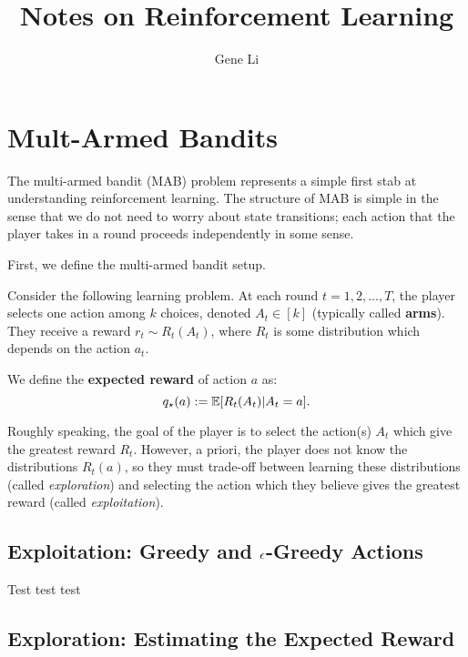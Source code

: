 \documentclass{article}
\title{Notes on Reinforcement Learning}
\author{Gene Li}
\begin{document}
\maketitle


\section{Mult-Armed Bandits}
The multi-armed bandit (MAB) problem represents a simple first stab at understanding reinforcement learning. The structure of MAB is simple in the sense that we do not need to worry about state transitions; each action that the player takes in a round proceeds independently in some sense.

First, we define the multi-armed bandit setup.

\begin{definition}
    Consider the following learning problem. At each round $t=1,2,...,T$, the player selects one action among $k$ choices, denoted $A_t \in [k]$ (typically called \textbf{arms}). They receive a reward $r_t \sim R_t(A_t)$, where $R_t$ is some distribution which depends on the action $a_t$. 
    
    We define the \textbf{expected reward} of action $a$ as:
    \begin{equation}
        q_\star(a) := \operatorname*{\mathbb{E}}[R_t(A_t)|A_t = a].
    \end{equation}
\end{definition}

Roughly speaking, the goal of the player is to select the action(s) $A_t$ which give the greatest reward $R_t$. However, a priori, the player does not know the distributions $R_t(a)$, so they must trade-off between learning these distributions (called \textit{exploration}) and selecting the action which they believe gives the greatest reward (called \textit{exploitation}).

\subsection{Exploitation: Greedy and $\epsilon$-Greedy Actions}
Test test test

\subsection{Exploration: Estimating the Expected Reward}
\end{document}
